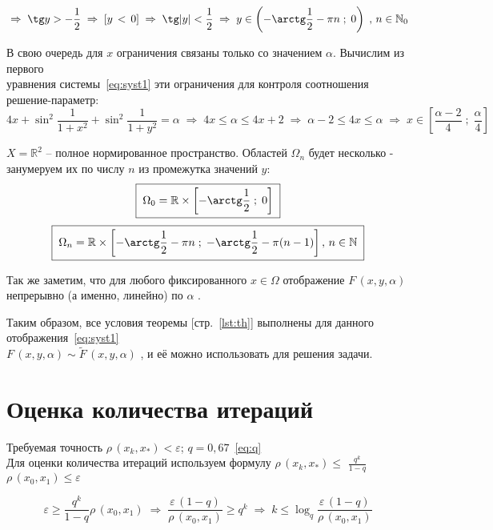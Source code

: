\documentclass[a4paper,12pt]{article}
\begin{document}
$$
    \;\Rightarrow\;
    \tg y > -\frac12                \;\Rightarrow\;
    \left[y\,<\,0\right]            \;\Rightarrow\;
    \tg |y| <\frac12                \;\Rightarrow\;
    y \in \left( -\arctg \frac12 - \pi n\;;\; 0 \right) \;,\,n \in \mathbb{N}_0
$$

\par\bigskip
В свою очередь для $x$ ограничения связаны только со значением $\alpha$.
Вычислим из первого \\ уравнения системы~\eqref{eq:syst1} эти ограничения для контроля соотношения решение-параметр:
$$
    4x + \sin^2 \frac{1}{1+x^2} + \sin^2 \frac{1}{1+y^2} = \alpha \;\Rightarrow\;
    4x \leq \alpha \leq 4x + 2  \;\Rightarrow\; 
     \alpha - 2 \leq 4x \leq \alpha   \;\Rightarrow\; 
    x \in \left[ \frac{\alpha - 2}4 \;;\; \frac{\alpha}4 \right]
$$
\par\bigskip

$ X = \mathbb{R}^2$ -- полное нормированное пространство.
Областей $\Omega_n$ будет несколько - занумеруем их по числу $n$ из промежутка значений $y$:
$$
    \boxed{\;\Omega_0 = \mathbb{R} \times 
    \left[ -\arctg \frac12 \;;\; 0 \right]\;}
$$
$$
    \boxed{\;\Omega_n = \mathbb{R} \times 
    \left[ -\arctg \frac12 - \pi n\;;\; -\arctg \frac12 - \pi(n-1) \right],
    \, n \in \mathbb{N}\;}
$$
\par\bigskip
Так же заметим, что для любого фиксированного $ x \in \Omega $ 
отображение $F\,(x,y,\alpha)$ \\
непрерывно (а именно, линейно) по $\alpha$ .
\par\bigskip

Таким образом, все условия теоремы [стр.~\ref{lst:th}]  
выполнены для данного отображения~\eqref{eq:syst1} \\
$F\,(x,y,\alpha) \sim \widetilde{F}\,(x, y, \alpha)$
, и её можно использовать для решения задачи.




\newpage
\section{\textcolor{WildStrawberry}{{Оценка количества итераций}}}
\par\bigskip

Требуемая точность 
$ \rho\,(x_k, x_*) < \varepsilon $;\; $q = 0,67$~\eqref{eq:q}\\
Для оценки количества итераций используем формулу 
$ \rho\,(x_k, x_*) \leq $ 
\large $ \frac{q^k}{1-q} $ \normalsize
$ \rho\,(x_0,x_1) \leq \varepsilon$
\par\medskip
\begin{equation}\label{eq:k1}
     \varepsilon \geq \frac{q^k}{1-q}  \rho\,(x_0,x_1)      \;\Rightarrow\;
    \frac{ \varepsilon\,(1-q)}{ \rho\,(x_0,x_1)} \geq q^k   \;\Rightarrow\;
    k \leq \log_q \frac{ \varepsilon\,(1-q)}{ \rho\,(x_0,x_1)}
\end{equation}
\par\bigskip
\end{document}
